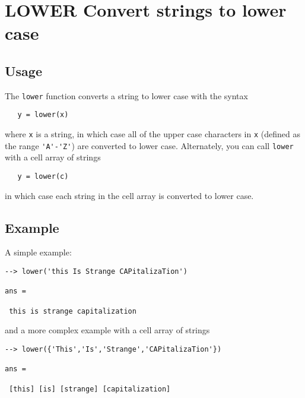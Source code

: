\section{LOWER Convert strings to lower case}

\subsection{Usage}

The \verb|lower| function converts a string to lower case with
the syntax
\begin{verbatim}
   y = lower(x)
\end{verbatim}
where \verb|x| is a string, in which case all of the upper case
characters in \verb|x| (defined as the range \verb|'A'-'Z'|) are
converted to lower case.  Alternately, you can call \verb|lower|
with a cell array of strings
\begin{verbatim}
   y = lower(c)
\end{verbatim}
in which case each string in the cell array is converted to lower case.
\subsection{Example}

A simple example:
\begin{verbatim}
--> lower('this Is Strange CAPitalizaTion')

ans = 

 this is strange capitalization
\end{verbatim}
and a more complex example with a cell array of strings
\begin{verbatim}
--> lower({'This','Is','Strange','CAPitalizaTion'})

ans = 

 [this] [is] [strange] [capitalization] 
\end{verbatim}
